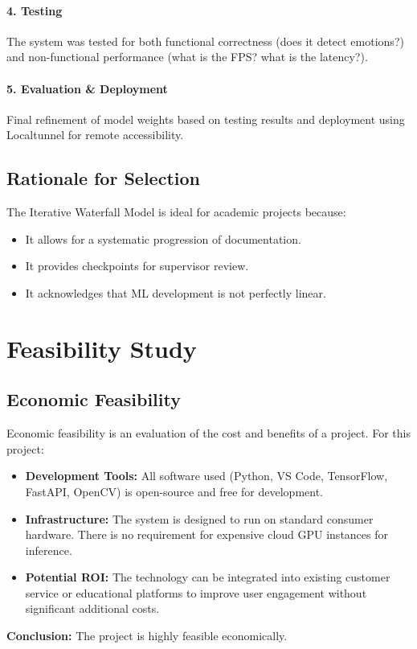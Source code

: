 \documentclass[12pt,a4paper]{report}
\begin{document}
\subsubsection{4. Testing}
The system was tested for both functional correctness (does it detect emotions?) and non-functional performance (what is the FPS? what is the latency?).

\subsubsection{5. Evaluation \& Deployment}
Final refinement of model weights based on testing results and deployment using Localtunnel for remote accessibility.

\section{Rationale for Selection}
The Iterative Waterfall Model is ideal for academic projects because:
\begin{itemize}
    \item It allows for a systematic progression of documentation.
    \item It provides checkpoints for supervisor review.
    \item It acknowledges that ML development is not perfectly linear.
\end{itemize}

\clearpage

\chapter{Feasibility Study}

\section{Economic Feasibility}
Economic feasibility is an evaluation of the cost and benefits of a project. For this project:
\begin{itemize}
    \item \textbf{Development Tools:} All software used (Python, VS Code, TensorFlow, FastAPI, OpenCV) is open-source and free for development.
    \item \textbf{Infrastructure:} The system is designed to run on standard consumer hardware. There is no requirement for expensive cloud GPU instances for inference.
    \item \textbf{Potential ROI:} The technology can be integrated into existing customer service or educational platforms to improve user engagement without significant additional costs.
\end{itemize}
\textbf{Conclusion:} The project is highly feasible economically.
\end{document}
